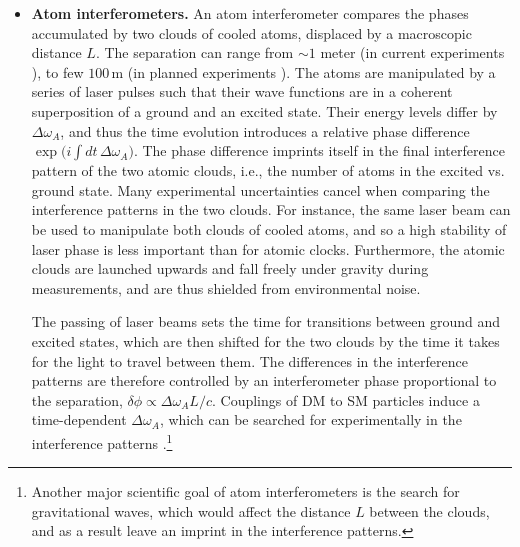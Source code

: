 \begin{itemize}
\item[$\diamond$]
{\bf Atom interferometers.} An atom interferometer compares the phases accumulated by two clouds of cooled atoms, displaced by a macroscopic distance $L$. 
The separation can range from $\sim 1$ meter (in current experiments \cite{bib:atomic:interfer:present}), 
to few $100\,$m (in planned experiments \cite{bib:atomic:interfer:future}). 
The atoms are manipulated by a series of laser pulses such that their wave functions are in a coherent superposition of a ground and an excited state. Their energy levels differ by $\Delta \omega_A$, and thus the time evolution introduces a relative phase difference 
$\exp(i \int dt \,\Delta \omega_A \big)$. The phase difference imprints itself in the final interference pattern of the two atomic clouds, i.e., the number of atoms in the excited vs. ground state. 
Many experimental uncertainties cancel when comparing the interference patterns in the two clouds. 
For instance, the same laser beam can be used to manipulate both clouds of cooled atoms, 
and so a high stability of laser phase is less important than for atomic clocks. 
Furthermore, the atomic clouds are launched upwards and fall freely under gravity during measurements, 
and are thus shielded from environmental noise. 

The passing of laser beams sets the time for transitions between ground and excited states, which are then shifted for the two clouds by the time it takes for the light to travel between them. The differences in the interference patterns are therefore controlled by an interferometer phase proportional to the separation, $\delta \phi\propto \Delta \omega_A L/c$. 
Couplings of DM to SM particles induce a time-dependent $\Delta \omega_A$, 
which can be searched for experimentally in the interference patterns \cite{bib:atomic:interfer:DM}.\footnote{Another major scientific goal of atom interferometers is the search for gravitational waves, which would affect the distance $L$ between the clouds, and as a result leave an imprint in the interference patterns.}




\end{itemize}
